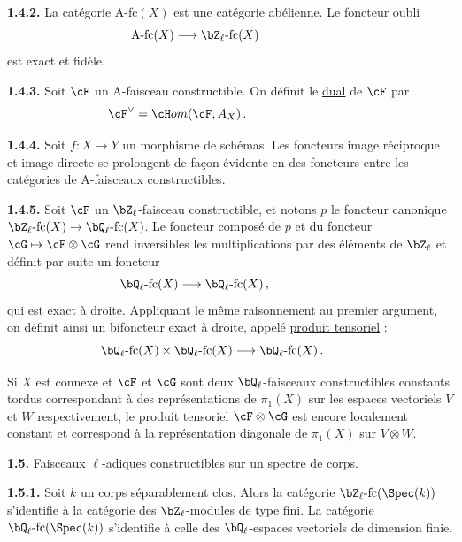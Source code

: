 \noindent
\textbf{1.4.2.} La cat\'egorie A-fc$(X)$ est une cat\'egorie ab\'elienne. Le foncteur oubli
\[
\text{A-fc}(X) \longrightarrow \bZ_{\ell}\text{-fc}(X)\hspace*{2cm}
\]
est exact et fid\`ele.

\smallskip

\noindent
\textbf{1.4.3.} Soit $\cF$ un A-faisceau constructible. On d\'efinit le \underline{dual} de $\cF$ par
\[
\cF^{\vee} = \cH om(\cF, A_X)\,.\hspace*{3cm}
\]

\smallskip

\noindent
\textbf{1.4.4.} Soit $f : X \rightarrow Y$ un morphisme de sch\'emas. Les foncteurs image r\'eciproque et image directe se prolongent de fa\c con \'evidente en des foncteurs entre les cat\'egories de A-faisceaux constructibles.

\smallskip

\noindent
\textbf{1.4.5.} Soit $\cF$ un $\bZ_{\ell}$-faisceau constructible, et notons $p$ le foncteur canonique $\bZ_{\ell}\text{-fc}(X) \rightarrow \bQ_{\ell}\text{-fc}(X)$. Le foncteur compos\'e de $p$ et du foncteur $\cG \mapsto \cF \otimes \cG$ rend inversibles les multiplications par des \'el\'ements de $\bZ_{\ell}$ et d\'efinit par suite un foncteur
\[
\bQ_{\ell}\text{-fc}(X) \longrightarrow \bQ_{\ell}\text{-fc}(X)\,,\hspace*{2cm}
\]
qui est exact \`a droite. Appliquant le m\^eme raisonnement au premier argument, on d\'efinit ainsi un bifoncteur exact \`a droite, appel\'e \underline{produit tensoriel} :
\[
\bQ_{\ell}\text{-fc}(X) \times \bQ_{\ell}\text{-fc}(X) \longrightarrow \bQ_{\ell}\text{-fc}(X)\,.\hspace*{1cm}
\]

Si $X$ est connexe et $\cF$ et $\cG$ sont deux $\bQ_{\ell}$-faisceaux constructibles constants tordus correspondant \`a des repr\'esentations de $\pi_1(X)$ sur les espaces vectoriels $V$ et $W$ respectivement, le produit tensoriel $\cF \otimes \cG$ est encore localement constant et correspond \`a la repr\'esentation diagonale de $\pi_1(X)$ sur $V \otimes W$.

\newpage

\noindent
\textbf{1.5.} \underline{Faisceaux $\ell$-adiques constructibles sur un spectre de corps.}

\noindent
\textbf{1.5.1.} Soit $k$ un corps s\'eparablement clos. Alors la cat\'egorie $\bZ_{\ell}\text{-fc}(\Spec(k))$ s'identifie \`a la cat\'egorie des $\bZ_{\ell}$-modules de type fini. La cat\'egorie $\bQ_{\ell}\text{-fc}(\Spec(k))$ s'identifie \`a celle des $\bQ_{\ell}$-espaces vectoriels de dimension finie.


